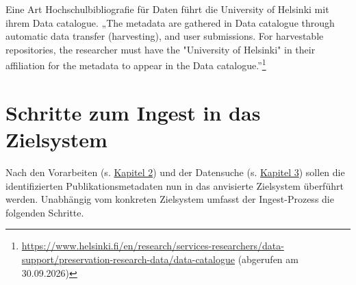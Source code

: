 \documentclass[
  ngerman,
  letterpaper,
  DIV=11]{scrreprt}
\begin{document}
Eine Art Hochschulbibliografie für Daten führt die University of
Helsinki mit ihrem Data catalogue. „The metadata are gathered in Data
catalogue through automatic data transfer (harvesting), and user
submissions. For harvestable repositories, the researcher must have the
"University of Helsinki" in their affiliation for the metadata to appear
in the Data catalogue.''\footnote{\url{https://www.helsinki.fi/en/research/services-researchers/data-support/preservation-research-data/data-catalogue}
  (abgerufen am 30.09.2026)}

\section{Schritte zum Ingest in das
Zielsystem}\label{schritte-zum-ingest-in-das-zielsystem}

Nach den Vorarbeiten (s. \hyperref[voruxfcberlegungen]{Kapitel 2}) und
der Datensuche (s. \hyperref[durchfuxfchrung]{Kapitel 3}) sollen die
identifizierten Publikationsmetadaten nun in das anvisierte Zielsystem
überführt werden. Unabhängig vom konkreten Zielsystem umfasst der
Ingest-Prozess die folgenden Schritte.
\end{document}
